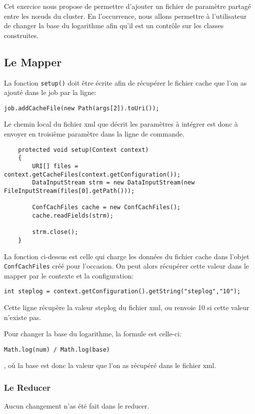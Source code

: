\documentclass[a4paper]{article}
\begin{document}
Cet exercice nous propose de permettre d'ajouter un fichier de paramètre partagé entre les nœuds du cluster. En l'occurrence, nous allons permettre à l'utilisateur de changer la base du logarithme afin qu'il est un contrôle sur les classes construites.

\subsection{Le Mapper}

La fonction \verb?setup()? doit être écrite afin de récupérer le fichier cache que l'on as ajouté dans le job par la ligne:
\begin{lstlisting}
job.addCacheFile(new Path(args[2]).toUri());
\end{lstlisting}

Le chemin local du fichier xml que décrit les paramètres à intégrer est donc à envoyer en troisième paramètre dans la ligne de commande.

\begin{lstlisting}
	protected void setup(Context context)
	{
	    URI[] files = context.getCacheFiles(context.getConfiguration());
	    DataInputStream strm = new DataInputStream(new FileInputStream(files[0].getPath()));

	    ConfCachFiles cache = new ConfCachFiles();
	    cache.readFields(strm);
	    
	    strm.close();
	}
\end{lstlisting} 

La fonction ci-dessus est celle qui charge les données du fichier cache dans l'objet \verb?ConfCachFiles? créé pour l'occasion.
On peut alors récupérer cette valeur dans le mapper par le contexte et la configuration:
\begin{lstlisting}
int steplog = context.getConfiguration().getString("steplog","10");
\end{lstlisting}
Cette ligne récupère la valeur steplog du fichier xml, ou renvoie 10 si cette valeur n'existe pas.

Pour changer la base du logarithme, la formule est celle-ci:
\begin{lstlisting}
Math.log(num) / Math.log(base)
\end{lstlisting}
, où la base est donc la valeur que l'on as récupéré dans le fichier xml.

\subsubsection{Le Reducer}

Aucun changement n'as été fait dans le reducer.
\end{document}
